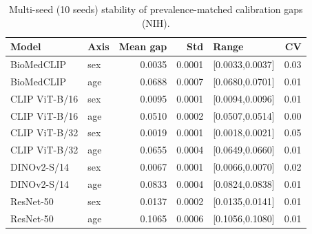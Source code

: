 \begin{table}[t]
  \centering
  \small
  \caption{Multi-seed (10 seeds) stability of prevalence-matched calibration gaps (NIH).}
  \label{tab:multiseed}
  \begin{tabular}{llrrlr}
    \toprule
    \textbf{Model} & \textbf{Axis} & \textbf{Mean gap} & \textbf{Std} & \textbf{Range} & \textbf{CV} \\
    \midrule
    BioMedCLIP & sex & 0.0035 & 0.0001 & [0.0033,0.0037] & 0.03 \\
    BioMedCLIP & age & 0.0688 & 0.0007 & [0.0680,0.0701] & 0.01 \\
    \addlinespace[2pt]
    CLIP ViT-B/16 & sex & 0.0095 & 0.0001 & [0.0094,0.0096] & 0.01 \\
    CLIP ViT-B/16 & age & 0.0510 & 0.0002 & [0.0507,0.0514] & 0.00 \\
    \addlinespace[2pt]
    CLIP ViT-B/32 & sex & 0.0019 & 0.0001 & [0.0018,0.0021] & 0.05 \\
    CLIP ViT-B/32 & age & 0.0655 & 0.0004 & [0.0649,0.0660] & 0.01 \\
    \addlinespace[2pt]
    DINOv2-S/14 & sex & 0.0067 & 0.0001 & [0.0066,0.0070] & 0.02 \\
    DINOv2-S/14 & age & 0.0833 & 0.0004 & [0.0824,0.0838] & 0.01 \\
    \addlinespace[2pt]
    ResNet-50 & sex & 0.0137 & 0.0002 & [0.0135,0.0141] & 0.01 \\
    ResNet-50 & age & 0.1065 & 0.0006 & [0.1056,0.1080] & 0.01 \\
    \bottomrule
  \end{tabular}
\end{table}